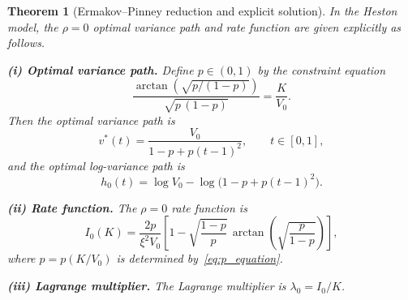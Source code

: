 \documentclass[11pt]{article}
\newtheorem{theorem}{Theorem}
\theoremstyle{definition}
\begin{document}
\begin{theorem}[Ermakov--Pinney reduction and explicit solution]\label{thm:heston}
In the Heston model, the $\rho=0$ optimal variance path and rate function are given explicitly as follows.

\textbf{(i) Optimal variance path.} Define $p \in (0,1)$ by the constraint equation
\begin{equation}\label{eq:p_equation}
  \frac{\arctan\!\left(\sqrt{p/(1-p)}\right)}{\sqrt{p\,(1-p)}} = \frac{K}{V_0}.
\end{equation}
Then the optimal variance path is
\begin{equation}\label{eq:v_optimal}
  v^*(t) = \frac{V_0}{1 - p + p(t-1)^2}, \qquad t \in [0,1],
\end{equation}
and the optimal log-variance path is
\begin{equation}\label{eq:h_optimal}
  h_0(t) = \log V_0 - \log\bigl(1 - p + p(t-1)^2\bigr).
\end{equation}

\textbf{(ii) Rate function.} The $\rho=0$ rate function is
\begin{equation}\label{eq:I0_heston}
  I_0(K) = \frac{2p}{\xi^2 V_0}\left[1 - \sqrt{\frac{1-p}{p}}\,\arctan\!\left(\sqrt{\frac{p}{1-p}}\right)\right],
\end{equation}
where $p = p(K/V_0)$ is determined by~\eqref{eq:p_equation}.

\textbf{(iii) Lagrange multiplier.} The Lagrange multiplier is $\lambda_0 = I_0/K$.
\end{theorem}
\end{document}
